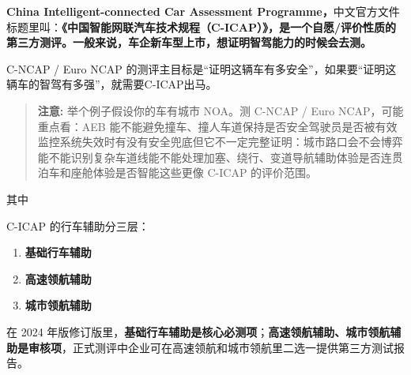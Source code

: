 \textbf{China Intelligent-connected Car Assessment Programme，}中文官方文件标题里叫：\textbf{《中国智能网联汽车技术规程（C-ICAP）》，是一个自愿/评价性质的第三方测评。一般来说，车企新车型上市，想证明智驾能力的时候会去测。}

C-NCAP / Euro NCAP 的测评主目标是“证明这辆车有多安全”，如果要“证明这辆车的智驾有多强”，就需要C-ICAP出马。

\begin{quote}
  \textbf{注意:} 举个例子假设你的车有城市 NOA。测 C-NCAP / Euro NCAP，可能重点看：AEB 能不能避免撞车、撞人车道保持是否安全驾驶员是否被有效监控系统失效时有没有安全兜底但它不一定完整证明：城市路口会不会博弈能不能识别复杂车道线能不能处理加塞、绕行、变道导航辅助体验是否连贯泊车和座舱体验是否智能这些更像 C-ICAP 的评价范围。
\end{quote}

其中

C-ICAP 的行车辅助分三层：

\begin{enumerate}
  \item \textbf{基础行车辅助}
  \item \textbf{高速领航辅助}
  \item \textbf{城市领航辅助}
\end{enumerate}

在 2024 年版修订版里，\textbf{基础行车辅助是核心必测项}；\textbf{高速领航辅助、城市领航辅助是审核项}，正式测评中企业可在高速领航和城市领航里二选一提供第三方测试报告。
